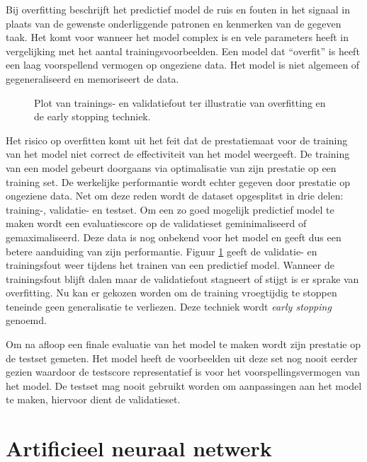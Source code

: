 \npar Bij overfitting beschrijft het predictief model de ruis en fouten in het signaal in plaats van de gewenste onderliggende patronen en kenmerken van de gegeven taak. Het komt voor wanneer het model complex is en vele parameters heeft in vergelijking met het aantal trainingsvoorbeelden. Een model dat ``overfit'' is heeft een laag voorspellend vermogen op ongeziene data. Het model is niet algemeen of gegeneraliseerd en  memoriseert de data. 

\begin{figure}
	\centering
	\def\svgscale{0.7}
	
	\caption{Plot van trainings- en validatiefout ter illustratie van overfitting en de early stopping techniek.}
	\label{fig:overfitting}
\end{figure}

\npar Het risico op overfitten komt uit het feit dat de prestatiemaat voor de training van het model niet correct de effectiviteit van het model weergeeft. De training van een model gebeurt doorgaans via optimalisatie van zijn prestatie op een training set. De werkelijke performantie wordt echter gegeven door prestatie op ongeziene data. Net om deze reden wordt de dataset opgesplitst in drie delen: training-, validatie- en testset.
\npar Om een zo goed mogelijk predictief model te maken wordt een evaluatiescore op de validatieset geminimaliseerd of gemaximaliseerd. Deze data is nog onbekend voor het model en geeft dus een betere aanduiding van zijn performantie. Figuur \ref{fig:overfitting} geeft de validatie- en trainingsfout weer tijdens het trainen van een predictief model. Wanneer de trainingsfout blijft dalen maar de validatiefout stagneert of stijgt is er sprake van overfitting. Nu kan er gekozen worden om de training vroegtijdig te stoppen teneinde geen generalisatie te verliezen. Deze techniek wordt \textit{early stopping} genoemd.

\npar Om na afloop een finale evaluatie van het model te maken wordt zijn prestatie op de testset gemeten. Het model heeft de voorbeelden uit deze set nog nooit eerder gezien waardoor de testscore representatief is voor het voorspellingsvermogen van het model. De testset mag nooit gebruikt worden om aanpassingen aan het model te maken, hiervoor dient de validatieset.

\section{Artificieel neuraal netwerk}\label{sec:ann}
